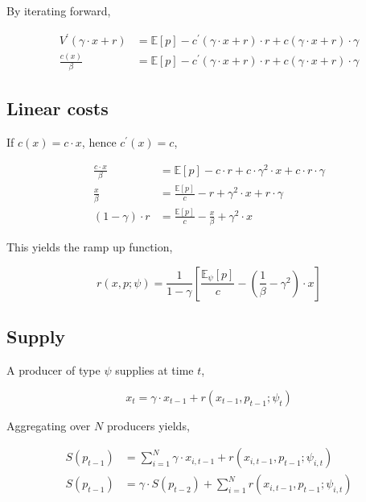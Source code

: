 \documentclass[american]{scrartcl}
\newcommand{\E}{\mathbb{E}}
\begin{document}
By iterating forward,

\begin{equation}
	\begin{split}
		V^\prime (\gamma \cdot x + r) &= \E[p] - c^\prime(\gamma \cdot x + r) \cdot r + c(\gamma \cdot x + r) \cdot \gamma \\
		\frac{c(x)}{\beta} &= \E[p] - c^\prime(\gamma \cdot x + r) \cdot r + c(\gamma \cdot x + r) \cdot \gamma
	\end{split}
\end{equation}

\subsection{Linear costs}

If $c(x) = c \cdot x$, hence $c^\prime(x) = c$,

\begin{equation}
	\begin{split}
		\frac{c \cdot x}{\beta} &= \E[p] - c \cdot r + c \cdot \gamma^2 \cdot x + c \cdot r \cdot \gamma \\
		\frac{x}{\beta} &= \frac{\E[p]}{c} - r + \gamma^2 \cdot x + r \cdot \gamma \\
		(1 - \gamma) \cdot r &= \frac{\E[p]}{c} - \frac{x}{\beta} + \gamma^2 \cdot x
	\end{split}
\end{equation}

This yields the ramp up function,

\begin{equation}
	r(x, p; \psi) = \frac{1}{1-\gamma} \left[ \frac{\E_\psi[p]}{c} - \left( \frac{1}{\beta} - \gamma^2 \right) \cdot x \right]
\end{equation}

\subsection{Supply}

A producer of type $\psi$ supplies at time $t$,

\begin{equation}
	x_t = \gamma \cdot x_{t-1} + r(x_{t-1}, p_{t-1}; \psi_t)
\end{equation}

Aggregating over $N$ producers yields,

\begin{equation}
	\begin{split}
		S(p_{t-1}) &= \sum^N_{i = 1} \gamma \cdot x_{i, t-1} + r(x_{i, t-1}, p_{t-1}; \psi_{i, t}) \\
		S(p_{t-1}) &= \gamma \cdot S(p_{t-2}) + \sum^N_{i = 1}  r(x_{i, t-1}, p_{t-1}; \psi_{i, t})
	\end{split}
\end{equation}
\end{document}
